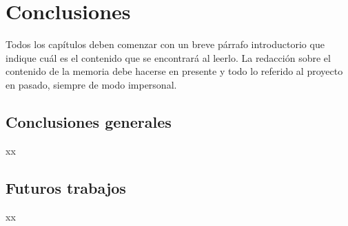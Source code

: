 
\chapter{Conclusiones} %

\label{Chapter5} %
Todos los capítulos deben comenzar con un breve párrafo introductorio que indique cuál es el contenido que se encontrará al leerlo.  La redacción sobre el contenido de la memoria debe hacerse en presente y todo lo referido al proyecto en pasado, siempre de modo impersonal.




\section{Conclusiones generales}

xx


\section{Futuros trabajos}

xx